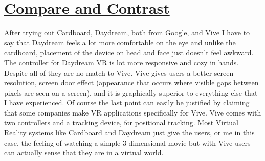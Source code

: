 \documentclass{article}
\begin{document}
\newpage

\section*{\underline{Compare and Contrast}}

After trying out Cardboard, Daydream, both from Google, and Vive I have to say that Daydream feels a lot more comfortable on the eye and unlike the cardboard, placement of the device on head and face just doesn't feel awkward. The controller for Daydream VR is lot more responsive and cozy in hands. Despite all of they are no match to Vive. Vive gives users a better screen resolution, screen door effect (appearance that occurs where visible gaps between pixels are seen on a screen),  and it is graphically superior to everything else that I have experienced. Of course the last point can easily be justified by claiming that some companies make VR applications specifically for Vive. Vive comes with two controllers and a tracking device, for positional tracking. Most Virtual Reality systems like Cardboard and Daydream just give the users, or me in this case, the feeling of watching a simple 3 dimensional movie but with Vive users can actually sense that they are in a virtual world. 
\end{document}
